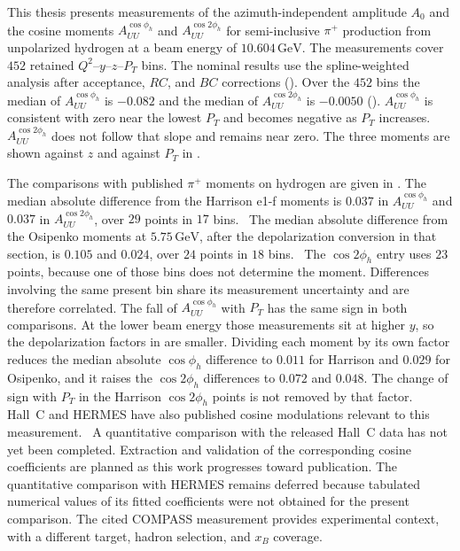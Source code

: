 This thesis presents measurements of the azimuth-independent amplitude $A_0$ and the cosine moments $A_{UU}^{\cos\phi_h}$ and $A_{UU}^{\cos 2\phi_h}$ for semi-inclusive $\pi^{+}$ production from unpolarized hydrogen at a beam energy of $10.604\,\mathrm{GeV}$. The measurements cover $452$ retained $Q^{2}$--$y$--$z$--$P_T$ bins. The nominal results use the spline-weighted analysis after acceptance, $RC$, and $BC$ corrections (). Over the $452$ bins the median of $A_{UU}^{\cos\phi_h}$ is $-0.082$ and the median of $A_{UU}^{\cos 2\phi_h}$ is $-0.0050$ (). $A_{UU}^{\cos\phi_h}$ is consistent with zero near the lowest $P_{T}$ and becomes negative as $P_{T}$ increases. $A_{UU}^{\cos 2\phi_h}$ does not follow that slope and remains near zero. The three moments are shown against $z$ and against $P_{T}$ in .

The comparisons with published $\pi^{+}$ moments on hydrogen are given in . The median absolute difference from the Harrison e1-f moments is $0.037$ in $A_{UU}^{\cos\phi_h}$ and $0.037$ in $A_{UU}^{\cos 2\phi_h}$, over $29$ points in $17$ bins.~\cite{HarrisonThesis} The median absolute difference from the Osipenko moments at $5.75\,\mathrm{GeV}$, after the depolarization conversion in that section, is $0.105$ and $0.024$, over $24$ points in $18$ bins.~\cite{Osipenko:2008rv} The $\cos 2\phi_h$ entry uses $23$ points, because one of those bins does not determine the moment. Differences involving the same present bin share its measurement uncertainty and are therefore correlated. The fall of $A_{UU}^{\cos\phi_h}$ with $P_{T}$ has the same sign in both comparisons. At the lower beam energy those measurements sit at higher $y$, so the depolarization factors in  are smaller. Dividing each moment by its own factor reduces the median absolute $\cos\phi_h$ difference to $0.011$ for Harrison and $0.029$ for Osipenko, and it raises the $\cos 2\phi_h$ differences to $0.072$ and $0.048$. The change of sign with $P_{T}$ in the Harrison $\cos 2\phi_h$ points is not removed by that factor. Hall~C and HERMES have also published cosine modulations relevant to this measurement.~\cite{HallCSIDIS:2025plr,Airapetian:2012yg} A quantitative comparison with the released Hall~C data has not yet been completed. Extraction and validation of the corresponding cosine coefficients are planned as this work progresses toward publication. The quantitative comparison with HERMES remains deferred because tabulated numerical values of its fitted coefficients were not obtained for the present comparison. The cited COMPASS measurement provides experimental context, with a different target, hadron selection, and $x_B$ coverage.~\cite{Adolph:2014pwc}

